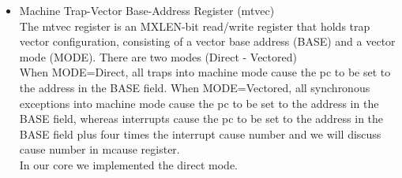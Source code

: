 \documentclass[../main.tex]{subfiles}
\begin{document}
\begin{itemize}
    \item Machine Trap-Vector Base-Address Register (mtvec)\\
        The mtvec register is an MXLEN-bit read/write register that holds trap vector configuration, consisting of a vector base address (BASE) and a vector mode (MODE).
        There are two modes (Direct - Vectored)\\
        When MODE=Direct, all traps into machine mode cause the pc to be set to the address in the BASE field. When MODE=Vectored, all synchronous exceptions into machine mode cause the pc to be set to the address in the BASE field, whereas interrupts cause the pc to be set to the address in the BASE field plus four times the interrupt cause number and we will discuss cause number in mcause register.\\
        In our core we implemented the direct mode.\\
            

\end{itemize}
\end{document}
